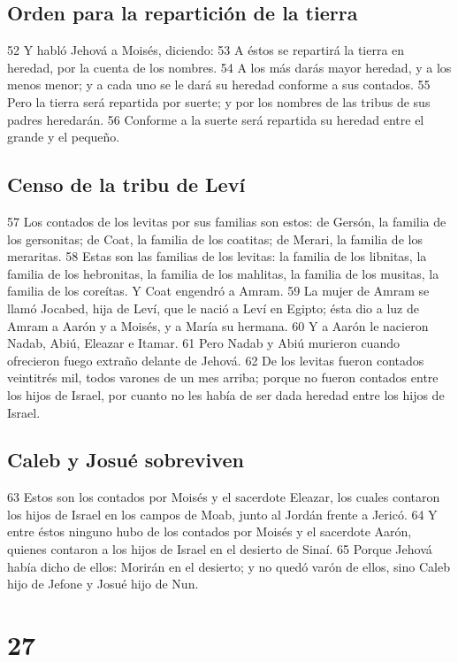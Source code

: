\section*{Orden para la repartición de la tierra }

52 Y habló Jehová a Moisés, diciendo:
53 A éstos se repartirá la tierra en heredad, por la cuenta de los nombres.
54 A los más darás mayor heredad, y a los menos menor; y a cada uno se le dará su heredad conforme a sus contados.
55 Pero la tierra será repartida por suerte; y por los nombres de las tribus de sus padres heredarán.
56 Conforme a la suerte será repartida su heredad entre el grande y el pequeño.
\section*{Censo de la tribu de Leví}

57 Los contados de los levitas por sus familias son estos: de Gersón, la familia de los gersonitas; de Coat, la familia de los coatitas; de Merari, la familia de los meraritas.
58 Estas son las familias de los levitas: la familia de los libnitas, la familia de los hebronitas, la familia de los mahlitas, la familia de los musitas, la familia de los coreítas. Y Coat engendró a Amram.
59 La mujer de Amram se llamó Jocabed, hija de Leví, que le nació a Leví en Egipto; ésta dio a luz de Amram a Aarón y a Moisés, y a María su hermana.
60 Y a Aarón le nacieron Nadab, Abiú, Eleazar e Itamar. 
61 Pero Nadab y Abiú murieron cuando ofrecieron fuego extraño delante de Jehová.
62 De los levitas fueron contados veintitrés mil, todos varones de un mes arriba; porque no fueron contados entre los hijos de Israel, por cuanto no les había de ser dada heredad entre los hijos de Israel.
\section*{Caleb y Josué sobreviven}

63 Estos son los contados por Moisés y el sacerdote Eleazar, los cuales contaron los hijos de Israel en los campos de Moab, junto al Jordán frente a Jericó.
64 Y entre éstos ninguno hubo de los contados por Moisés y el sacerdote Aarón, quienes contaron a los hijos de Israel en el desierto de Sinaí.
65 Porque Jehová había dicho de ellos: Morirán en el desierto; y no quedó varón de ellos, sino Caleb hijo de Jefone y Josué hijo de Nun. 

\chapter{27}

